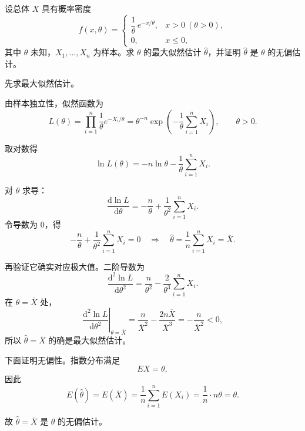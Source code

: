 ﻿\documentclass[lang=cn,11pt]{elegantbook}
\begin{document}
\begin{exercise}\label{exer:7-exp-mle}
设总体 \(X\) 具有概率密度
\[
f(x,\theta) = \begin{cases} \dfrac{1}{\theta}\,e^{-x/\theta}, & x > 0\ (\theta > 0), \\ 0, & x \leq 0, \end{cases}
\]
其中 \(\theta\) 未知，\(X_1, \dots, X_n\) 为样本。求 \(\theta\) 的最大似然估计 \(\hat{\theta}\)，并证明 \(\hat{\theta}\) 是 \(\theta\) 的无偏估计。
\end{exercise}
\begin{solution}
先求最大似然估计。

由样本独立性，似然函数为
\[
L(\theta)=\prod_{i=1}^n \frac{1}{\theta}e^{-X_i/\theta}
=\theta^{-n}\exp\!\left(-\frac{1}{\theta}\sum_{i=1}^n X_i\right),\qquad \theta>0.
\]

取对数得
\[
\ln L(\theta)=-n\ln\theta-\frac{1}{\theta}\sum_{i=1}^n X_i.
\]

对 \(\theta\) 求导：
\[
\frac{\mathrm{d}\ln L}{\mathrm{d}\theta}
=-\frac{n}{\theta}+\frac{1}{\theta^2}\sum_{i=1}^n X_i.
\]
令导数为 0，得
\[
-\frac{n}{\theta}+\frac{1}{\theta^2}\sum_{i=1}^n X_i=0
\quad\Longrightarrow\quad
\hat{\theta}=\frac{1}{n}\sum_{i=1}^n X_i=\overline{X}.
\]

再验证它确实对应极大值。二阶导数为
\[
\frac{\mathrm{d}^2\ln L}{\mathrm{d}\theta^2}
=\frac{n}{\theta^2}-\frac{2}{\theta^3}\sum_{i=1}^n X_i.
\]
在 \(\theta=\overline{X}\) 处，
\[
\left.\frac{\mathrm{d}^2\ln L}{\mathrm{d}\theta^2}\right|_{\theta=\overline{X}}
=\frac{n}{\overline{X}^2}-\frac{2n\overline{X}}{\overline{X}^3}
=-\frac{n}{\overline{X}^2}<0,
\]
所以 \(\hat{\theta}=\overline{X}\) 的确是最大似然估计。

下面证明无偏性。指数分布满足
\[
EX=\theta,
\]
因此
\[
E(\hat{\theta})=E(\overline{X})=\frac{1}{n}\sum_{i=1}^n E(X_i)=\frac{1}{n}\cdot n\theta=\theta.
\]

故 \(\hat{\theta}=\overline{X}\) 是 \(\theta\) 的无偏估计。
\end{solution}
\end{document}
